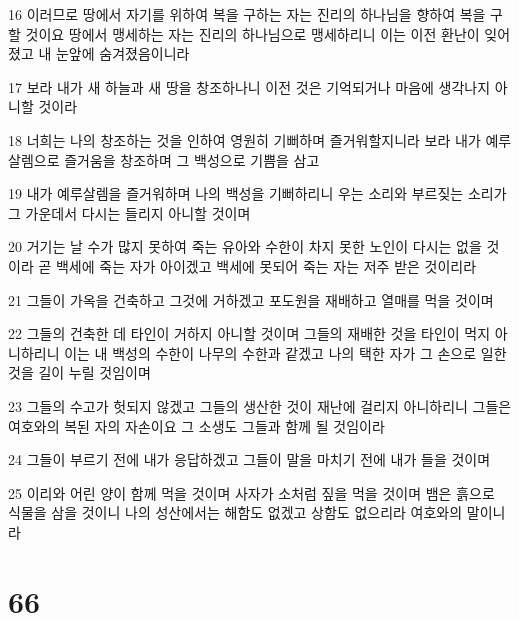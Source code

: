 \par 16 이러므로 땅에서 자기를 위하여 복을 구하는 자는 진리의 하나님을 향하여 복을 구할 것이요 땅에서 맹세하는 자는 진리의 하나님으로 맹세하리니 이는 이전 환난이 잊어졌고 내 눈앞에 숨겨졌음이니라
\par 17 보라 내가 새 하늘과 새 땅을 창조하나니 이전 것은 기억되거나 마음에 생각나지 아니할 것이라
\par 18 너희는 나의 창조하는 것을 인하여 영원히 기뻐하며 즐거워할지니라 보라 내가 예루살렘으로 즐거움을 창조하며 그 백성으로 기쁨을 삼고
\par 19 내가 예루살렘을 즐거워하며 나의 백성을 기뻐하리니 우는 소리와 부르짖는 소리가 그 가운데서 다시는 들리지 아니할 것이며
\par 20 거기는 날 수가 많지 못하여 죽는 유아와 수한이 차지 못한 노인이 다시는 없을 것이라 곧 백세에 죽는 자가 아이겠고 백세에 못되어 죽는 자는 저주 받은 것이리라
\par 21 그들이 가옥을 건축하고 그것에 거하겠고 포도원을 재배하고 열매를 먹을 것이며
\par 22 그들의 건축한 데 타인이 거하지 아니할 것이며 그들의 재배한 것을 타인이 먹지 아니하리니 이는 내 백성의 수한이 나무의 수한과 같겠고 나의 택한 자가 그 손으로 일한 것을 길이 누릴 것임이며
\par 23 그들의 수고가 헛되지 않겠고 그들의 생산한 것이 재난에 걸리지 아니하리니 그들은 여호와의 복된 자의 자손이요 그 소생도 그들과 함께 될 것임이라
\par 24 그들이 부르기 전에 내가 응답하겠고 그들이 말을 마치기 전에 내가 들을 것이며
\par 25 이리와 어린 양이 함께 먹을 것이며 사자가 소처럼 짚을 먹을 것이며 뱀은 흙으로 식물을 삼을 것이니 나의 성산에서는 해함도 없겠고 상함도 없으리라 여호와의 말이니라

\chapter{66}

